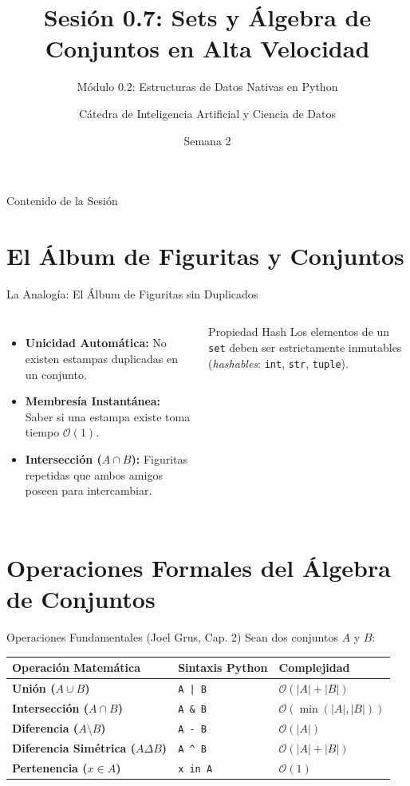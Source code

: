 \documentclass[aspectratio=169]{beamer}
\title[INT210 - Sesión 0.7]{Sesión 0.7: Sets y Álgebra de Conjuntos en Alta Velocidad}
\subtitle{Módulo 0.2: Estructuras de Datos Nativas en Python}
\author[Diplomado en Ciencia de Datos]{Cátedra de Inteligencia Artificial y Ciencia de Datos}
\institute[INT210]{Machine Learning From Scratch}
\date{Semana 2}
\begin{document}
\frame{\titlepage}

\begin{frame}{Contenido de la Sesión}
    \tableofcontents
\end{frame}

\section{El Álbum de Figuritas y Conjuntos}

\begin{frame}{La Analogía: El Álbum de Figuritas sin Duplicados}
    \begin{columns}
        \begin{itemize}
            \item \textbf{Unicidad Automática:} No existen estampas duplicadas en un conjunto.
            \item \textbf{Membresía Instantánea:} Saber si una estampa existe toma tiempo $\mathcal{O}(1)$.
            \item \textbf{Intersección ($A \cap B$):} Figuritas repetidas que ambos amigos poseen para intercambiar.
        \end{itemize}
        \begin{alertblock}{Propiedad Hash}
            Los elementos de un \texttt{set} deben ser estrictamente inmutables (\textit{hashables}: \texttt{int}, \texttt{str}, \texttt{tuple}).
        \end{alertblock}
    \end{columns}
\end{frame}

\section{Operaciones Formales del Álgebra de Conjuntos}

\begin{frame}{Operaciones Fundamentales (Joel Grus, Cap. 2)}
    Sean dos conjuntos $A$ y $B$:
    \begin{center}
    \begin{tabular}{lll}
        \toprule
        \textbf{Operación Matemática} & \textbf{Sintaxis Python} & \textbf{Complejidad} \\
        \midrule
        \textbf{Unión ($A \cup B$)} & \texttt{A | B} & $\mathcal{O}(|A| + |B|)$ \\
        \textbf{Intersección ($A \cap B$)} & \texttt{A \& B} & $\mathcal{O}(\min(|A|, |B|))$ \\
        \textbf{Diferencia ($A \setminus B$)} & \texttt{A - B} & $\mathcal{O}(|A|)$ \\
        \textbf{Diferencia Simétrica ($A \Delta B$)} & \texttt{A \^{} B} & $\mathcal{O}(|A| + |B|)$ \\
        \textbf{Pertenencia ($x \in A$)} & \texttt{x in A} & $\mathcal{O}(1)$ \\
        \bottomrule
    \end{tabular}
    \end{center}
\end{frame}
\end{document}
